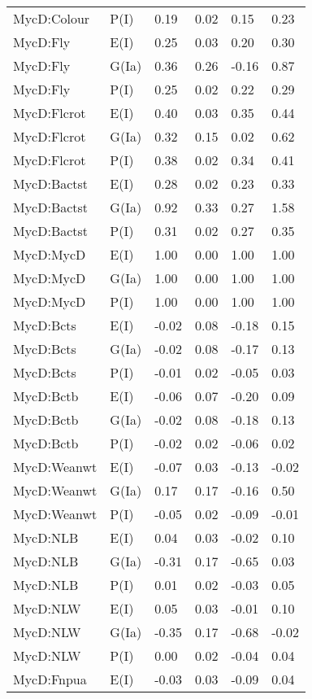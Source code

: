 \begin{center}
\begin{longtable}{|p{1.1in}|p{0.7in}|p{0.7in}|p{0.6in}|p{0.6in}|p{0.6in}|}
  MycD:Colour & P(I) & 0.19 & 0.02 & 0.15 & 0.23 \\ 
  MycD:Fly & E(I) & 0.25 & 0.03 & 0.20 & 0.30 \\ 
  MycD:Fly & G(Ia) & 0.36 & 0.26 & -0.16 & 0.87 \\ 
  MycD:Fly & P(I) & 0.25 & 0.02 & 0.22 & 0.29 \\ 
  MycD:Flcrot & E(I) & 0.40 & 0.03 & 0.35 & 0.44 \\ 
  MycD:Flcrot & G(Ia) & 0.32 & 0.15 & 0.02 & 0.62 \\ 
  MycD:Flcrot & P(I) & 0.38 & 0.02 & 0.34 & 0.41 \\ 
  MycD:Bactst & E(I) & 0.28 & 0.02 & 0.23 & 0.33 \\ 
  MycD:Bactst & G(Ia) & 0.92 & 0.33 & 0.27 & 1.58 \\ 
  MycD:Bactst & P(I) & 0.31 & 0.02 & 0.27 & 0.35 \\ 
  MycD:MycD & E(I) & 1.00 & 0.00 & 1.00 & 1.00 \\ 
  MycD:MycD & G(Ia) & 1.00 & 0.00 & 1.00 & 1.00 \\ 
  MycD:MycD & P(I) & 1.00 & 0.00 & 1.00 & 1.00 \\ 
  MycD:Bcts & E(I) & -0.02 & 0.08 & -0.18 & 0.15 \\ 
  MycD:Bcts & G(Ia) & -0.02 & 0.08 & -0.17 & 0.13 \\ 
  MycD:Bcts & P(I) & -0.01 & 0.02 & -0.05 & 0.03 \\ 
  MycD:Bctb & E(I) & -0.06 & 0.07 & -0.20 & 0.09 \\ 
  MycD:Bctb & G(Ia) & -0.02 & 0.08 & -0.18 & 0.13 \\ 
  MycD:Bctb & P(I) & -0.02 & 0.02 & -0.06 & 0.02 \\ 
  MycD:Weanwt & E(I) & -0.07 & 0.03 & -0.13 & -0.02 \\ 
  MycD:Weanwt & G(Ia) & 0.17 & 0.17 & -0.16 & 0.50 \\ 
  MycD:Weanwt & P(I) & -0.05 & 0.02 & -0.09 & -0.01 \\ 
  MycD:NLB & E(I) & 0.04 & 0.03 & -0.02 & 0.10 \\ 
  MycD:NLB & G(Ia) & -0.31 & 0.17 & -0.65 & 0.03 \\ 
  MycD:NLB & P(I) & 0.01 & 0.02 & -0.03 & 0.05 \\ 
  MycD:NLW & E(I) & 0.05 & 0.03 & -0.01 & 0.10 \\ 
  MycD:NLW & G(Ia) & -0.35 & 0.17 & -0.68 & -0.02 \\ 
  MycD:NLW & P(I) & 0.00 & 0.02 & -0.04 & 0.04 \\ 
  MycD:Fnpua & E(I) & -0.03 & 0.03 & -0.09 & 0.04 \\ 

\end{longtable}
\end{center}

